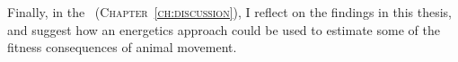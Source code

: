 \medskip

Finally, in the {\scshape~(Chapter~\ref{ch:discussion})}, I reflect on the findings in this thesis, and suggest how an energetics approach could be used to estimate some of the fitness consequences of animal movement.


\endgroup

{ \begin{center}  \end{center} }

\vfill

\cleardoublepage
